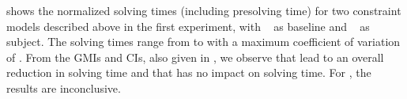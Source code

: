  shows the normalized
solving times (including \gls{presolving} time) for two \glspl{constraint model}
described above in the first experiment, with ~\modelA{} as \gls{baseline} and ~\modelB{}
as \gls{subject}.
%
The solving times range from
\printMinSolvingTime{
  \SolvTechDisableDomConsLocsOfStatesPrePlusSolvingTimeSpeedupAllPrePlusSolvingTimeAvgMin,
  \SolvTechDisableDomConsLocsOfStatesPrePlusSolvingTimeSpeedupPrePlusSolvingTimeAvgMin,
  \SolvTechDisableDomConsOperandsOfNonSelectedMatchesPrePlusSolvingTimeSpeedupPrePlusSolvingTimeAvgMin,
  \SolvTechDisableImplConsInputOperandsNotTakingMinValuePrePlusSolvingTimeSpeedupPrePlusSolvingTimeAvgMin,
  \SolvTechDisableDomConsInterchDataChainsPrePlusSolvingTimeSpeedupPrePlusSolvingTimeAvgMin,
  \SolvTechDisableDomConsNullCopyMatchSelectionPrePlusSolvingTimeSpeedupPrePlusSolvingTimeAvgMin,
  \SolvTechDisableDomConsKillMatchSelectionPrePlusSolvingTimeSpeedupPrePlusSolvingTimeAvgMin
} to
\printMaxSolvingTime{
  \SolvTechDisableDomConsLocsOfStatesPrePlusSolvingTimeSpeedupAllPrePlusSolvingTimeAvgMax,
  \SolvTechDisableDomConsLocsOfStatesPrePlusSolvingTimeSpeedupPrePlusSolvingTimeAvgMax,
  \SolvTechDisableDomConsOperandsOfNonSelectedMatchesPrePlusSolvingTimeSpeedupPrePlusSolvingTimeAvgMax,
  \SolvTechDisableImplConsInputOperandsNotTakingMinValuePrePlusSolvingTimeSpeedupPrePlusSolvingTimeAvgMax,
  \SolvTechDisableDomConsInterchDataChainsPrePlusSolvingTimeSpeedupPrePlusSolvingTimeAvgMax,
  \SolvTechDisableDomConsNullCopyMatchSelectionPrePlusSolvingTimeSpeedupPrePlusSolvingTimeAvgMax,
  \SolvTechDisableDomConsKillMatchSelectionPrePlusSolvingTimeSpeedupPrePlusSolvingTimeAvgMax
} with a maximum coefficient of variation of
\numMaxOf{
  \SolvTechDisableDomConsLocsOfStatesPrePlusSolvingTimeSpeedupAllPrePlusSolvingTimeCvMax,
  \SolvTechDisableDomConsLocsOfStatesPrePlusSolvingTimeSpeedupPrePlusSolvingTimeCvMax,
  \SolvTechDisableDomConsOperandsOfNonSelectedMatchesPrePlusSolvingTimeSpeedupPrePlusSolvingTimeCvMax,
  \SolvTechDisableImplConsInputOperandsNotTakingMinValuePrePlusSolvingTimeSpeedupPrePlusSolvingTimeCvMax,
  \SolvTechDisableDomConsInterchDataChainsPrePlusSolvingTimeSpeedupPrePlusSolvingTimeCvMax,
  \SolvTechDisableDomConsNullCopyMatchSelectionPrePlusSolvingTimeSpeedupPrePlusSolvingTimeCvMax,
  \SolvTechDisableDomConsKillMatchSelectionPrePlusSolvingTimeSpeedupPrePlusSolvingTimeCvMax
}.
%
From the \glspl{GMI} and \glspl{CI}, also given in
, we observe that
 lead to an overall reduction in solving time
and that  has no
impact on solving time.
%
For , the
results are inconclusive.


